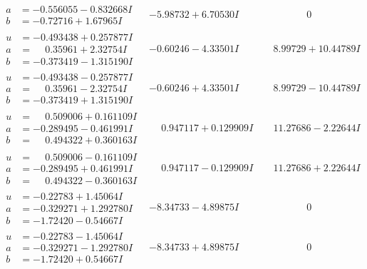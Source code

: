 \documentclass[1p]{elsarticle_modified}
\theoremstyle{definition}
\begin{document}
$$\begin{array}{c|c|c}
\begin{aligned}
a &= -0.556055 - 0.832668 I \\
b &= -0.72716 + 1.67965 I\end{aligned}
 & -5.98732 + 6.70530 I & \phantom{-0.000000 } 0 \\ \hline\begin{aligned}
u &= -0.493438 + 0.257877 I \\
a &= \phantom{-}0.35961 + 2.32754 I \\
b &= -0.373419 - 1.315190 I\end{aligned}
 & -0.60246 - 4.33501 I & \phantom{-}8.99729 + 10.44789 I \\ \hline\begin{aligned}
u &= -0.493438 - 0.257877 I \\
a &= \phantom{-}0.35961 - 2.32754 I \\
b &= -0.373419 + 1.315190 I\end{aligned}
 & -0.60246 + 4.33501 I & \phantom{-}8.99729 - 10.44789 I \\ \hline\begin{aligned}
u &= \phantom{-}0.509006 + 0.161109 I \\
a &= -0.289495 - 0.461991 I \\
b &= \phantom{-}0.494322 + 0.360163 I\end{aligned}
 & \phantom{-}0.947117 + 0.129909 I & \phantom{-}11.27686 - 2.22644 I \\ \hline\begin{aligned}
u &= \phantom{-}0.509006 - 0.161109 I \\
a &= -0.289495 + 0.461991 I \\
b &= \phantom{-}0.494322 - 0.360163 I\end{aligned}
 & \phantom{-}0.947117 - 0.129909 I & \phantom{-}11.27686 + 2.22644 I \\ \hline\begin{aligned}
u &= -0.22783 + 1.45064 I \\
a &= -0.329271 + 1.292780 I \\
b &= -1.72420 - 0.54667 I\end{aligned}
 & -8.34733 - 4.89875 I & \phantom{-0.000000 } 0 \\ \hline\begin{aligned}
u &= -0.22783 - 1.45064 I \\
a &= -0.329271 - 1.292780 I \\
b &= -1.72420 + 0.54667 I\end{aligned}
 & -8.34733 + 4.89875 I & \phantom{-0.000000 } 0 \\ \hline\begin{aligned}

\end{aligned}
\end{array}$$
\end{document}
